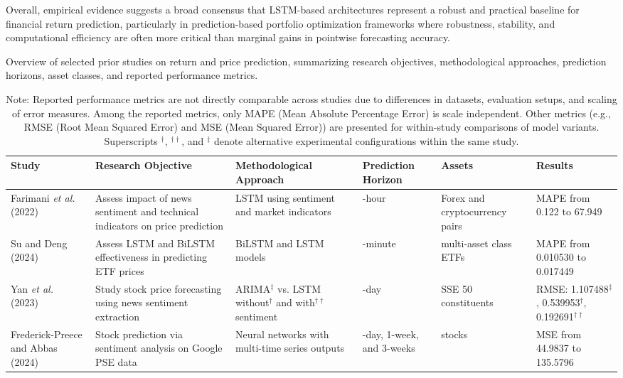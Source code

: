Overall, empirical evidence suggests a broad consensus that LSTM-based architectures represent a robust and practical baseline for financial return prediction, particularly in prediction-based portfolio optimization frameworks where robustness, stability, and computational efficiency are often more critical than marginal gains in pointwise forecasting accuracy.

\begin{table}[ht]
\centering
\caption{Overview of selected prior studies on return and price prediction, summarizing research objectives, methodological approaches, prediction horizons, asset classes, and reported performance metrics.}
\label{tab:literature_review_prediction}
\begin{tabular}{|>{\centering\arraybackslash}m{1.5cm}|
                >{\centering\arraybackslash}m{3cm}|
                >{\centering\arraybackslash}m{3cm}|
                >{\centering\arraybackslash}m{2cm}|
                >{\centering\arraybackslash}m{2cm}|
                >{\centering\arraybackslash}m{1.5cm}|}
\hline
\textbf{Study} & \textbf{Research Objective} & \textbf{Methodological Approach} & \textbf{Prediction Horizon} & \textbf{Assets} & \textbf{Results} \\
\hline

Farimani \emph{et al.} (2022)~\cite{a2e88}
  & Assess impact of news sentiment and technical indicators on price prediction
  & LSTM using sentiment and market indicators
  & 1-hour
  & Forex and cryptocurrency pairs
  & MAPE from 0.122 to 67.949 \\
\hline
Su and Deng (2024)~\cite{34309}
  & Assess LSTM and BiLSTM effectiveness in predicting ETF prices
  & BiLSTM and LSTM models
  & 1-minute
  & 41 multi-asset class ETFs
  & MAPE from 0.010530 to 0.017449 \\
\hline
Yan \emph{et al.} (2023)~\cite{9c443}
  & Study stock price forecasting using news sentiment extraction
  & ARIMA$^{\ddagger}$ vs. LSTM without$^{\dagger}$ and with$^{\dagger\dagger}$ sentiment
  & 1-day
  & SSE 50 constituents
  & RMSE: 1.107488$^{\ddagger}$, 0.539953$^{\dagger}$, 0.192691$^{\dagger\dagger}$ \\
\hline
Frederick-Preece and Abbas (2024)~\cite{2b4c0}
  & Stock prediction via sentiment analysis on Google PSE data
  & Neural networks with multi-time series outputs
  & 1-day, 1-week, and 3-weeks
  & 20 stocks
  & MSE from 44.9837 to 135.5796 \\
\hline
\end{tabular}
\caption*{\footnotesize
Note: Reported performance metrics are not directly comparable across studies due to differences in datasets, evaluation setups, and scaling of error measures. Among the reported metrics, only MAPE (Mean Absolute Percentage Error) is scale independent. Other metrics (e.g., RMSE (Root Mean Squared Error) and MSE (Mean Squared Error)) are presented for within-study comparisons of model variants. Superscripts $^{\dagger}$, $^{\dagger\dagger}$, and $^{\ddagger}$ denote alternative experimental configurations within the same study.
}
\end{table}

